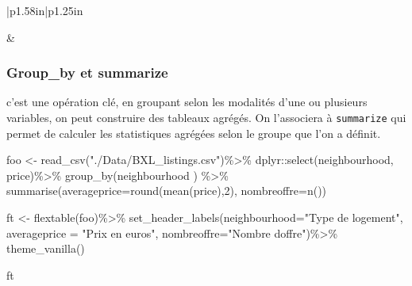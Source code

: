 \documentclass[
]{book}
\newenvironment{Shaded}{\begin{snugshade}}{\end{snugshade}}
\newcommand{\AttributeTok}[1]{\textcolor[rgb]{0.77,0.63,0.00}{#1}}
\newcommand{\DecValTok}[1]{\textcolor[rgb]{0.00,0.00,0.81}{#1}}
\newcommand{\FunctionTok}[1]{\textcolor[rgb]{0.00,0.00,0.00}{#1}}
\newcommand{\NormalTok}[1]{#1}
\newcommand{\OtherTok}[1]{\textcolor[rgb]{0.56,0.35,0.01}{#1}}
\newcommand{\SpecialCharTok}[1]{\textcolor[rgb]{0.00,0.00,0.00}{#1}}
\newcommand{\StringTok}[1]{\textcolor[rgb]{0.31,0.60,0.02}{#1}}
\begin{document}
\begin{longtable}[c]{|p{1.58in}|p{1.25in}}
\noalign{\global\setlength{\arrayrulewidth}{0.5pt}}



 &  \\

\noalign{\global\setlength{\arrayrulewidth}{2pt}}



\end{longtable}

\hypertarget{group_by-et-summarize}{%
\subsubsection{Group\_by et summarize}\label{group_by-et-summarize}}

c'est une opération clé, en groupant selon les modalités d'une ou plusieurs variables, on peut construire des tableaux agrégés. On l'associera à \texttt{summarize} qui permet de calculer les statistiques agrégées selon le groupe que l'on a définit.

\begin{Shaded}
\begin{Highlighting}[]
\NormalTok{foo }\OtherTok{\textless{}{-}} \FunctionTok{read\_csv}\NormalTok{(}\StringTok{"./Data/BXL\_listings.csv"}\NormalTok{)}\SpecialCharTok{\%\textgreater{}\%} 
\NormalTok{  dplyr}\SpecialCharTok{::}\FunctionTok{select}\NormalTok{(neighbourhood, price)}\SpecialCharTok{\%\textgreater{}\%}
    \FunctionTok{group\_by}\NormalTok{(neighbourhood ) }\SpecialCharTok{\%\textgreater{}\%} 
  \FunctionTok{summarise}\NormalTok{(}\AttributeTok{averageprice=}\FunctionTok{round}\NormalTok{(}\FunctionTok{mean}\NormalTok{(price),}\DecValTok{2}\NormalTok{),}
            \AttributeTok{nombreoffre=}\FunctionTok{n}\NormalTok{())}

\NormalTok{ft }\OtherTok{\textless{}{-}} \FunctionTok{flextable}\NormalTok{(foo)}\SpecialCharTok{\%\textgreater{}\%} 
     \FunctionTok{set\_header\_labels}\NormalTok{(}\AttributeTok{neighbourhood=}\StringTok{"Type de logement"}\NormalTok{,}
  \AttributeTok{averageprice =} \StringTok{"Prix en euros"}\NormalTok{,}
  \AttributeTok{nombreoffre=}\StringTok{"Nombre d\textquotesingle{}offre"}\NormalTok{)}\SpecialCharTok{\%\textgreater{}\%}
  \FunctionTok{theme\_vanilla}\NormalTok{() }

\NormalTok{ft}
\end{Highlighting}
\end{Shaded}
\end{document}
